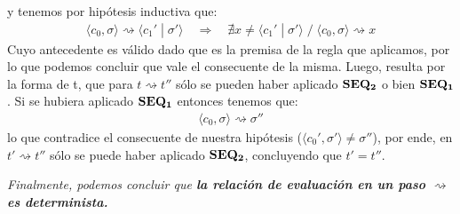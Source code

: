 \documentclass[a4paper,10pt]{article}
\begin{document}
\begin{itemize}
			y tenemos por hipótesis inductiva que:
				\begin{align*} \langle c_{0},\sigma\rangle \rightsquigarrow \langle c_{1}' \;|\; \sigma' \rangle \quad \Rightarrow \quad \nexists x \neq \langle c_{1}' \;|\; \sigma' \rangle \;{\big /}\; \langle c_{0},\sigma\rangle \rightsquigarrow x \end{align*}
			Cuyo antecedente es válido dado que es la premisa de la regla que aplicamos, por lo que podemos concluir que vale el consecuente de la misma. Luego, resulta por la forma de t, que para $t \rightsquigarrow t''$ sólo se pueden haber aplicado ${\bf SEQ_{2}}$ o bien ${\bf SEQ_{1}}$.
			Si se hubiera aplicado ${\bf SEQ_{1}}$ entonces tenemos que:
				\begin{align*} \langle c_{0},\sigma\rangle \rightsquigarrow \sigma'' \end{align*}
			lo que contradice el consecuente de nuestra hipótesis ($ \langle c_{0}',\sigma' \rangle \neq \sigma''$), por ende, en $t' \rightsquigarrow t''$ sólo se puede haber aplicado ${\bf SEQ_{2}}$, concluyendo que $t'= t''$.
	\end{itemize}
	
	\vspace{5pt}
	\emph{Finalmente, podemos concluir que \textbf{la relación de evaluación en un paso $\rightsquigarrow$ es determinista.}}
	\\
\end{document}
